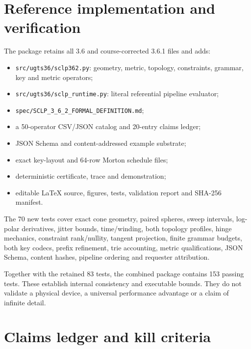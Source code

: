 \documentclass[10pt,a4paper]{article}
\newcommand{\code}[1]{\texttt{#1}}
\begin{document}
\section{Reference implementation and verification}

The package retains all 3.6 and course-corrected 3.6.1 files and adds:
\begin{itemize}
\item \code{src/ugts36/sclp362.py}: geometry, metric, topology, constraints, grammar, key and metric operators;
\item \code{src/ugts36/sclp\_runtime.py}: literal referential pipeline evaluator;
\item \code{spec/SCLP\_3\_6\_2\_FORMAL\_DEFINITION.md};
\item a 50-operator CSV/JSON catalog and 20-entry claims ledger;
\item JSON Schema and content-addressed example substrate;
\item exact key-layout and 64-row Morton schedule files;
\item deterministic certificate, trace and demonstration;
\item editable LaTeX source, figures, tests, validation report and SHA-256 manifest.
\end{itemize}

The 70 new tests cover exact cone geometry, paired spheres, sweep intervals, log-polar derivatives, jitter bounds, time/winding, both topology profiles, hinge mechanics, constraint rank/nullity, tangent projection, finite grammar budgets, both key codecs, prefix refinement, trie accounting, metric qualifications, JSON Schema, content hashes, pipeline ordering and requester attribution.

Together with the retained 83 tests, the combined package contains 153 passing tests. These establish internal consistency and executable bounds. They do not validate a physical device, a universal performance advantage or a claim of infinite detail.

\section{Claims ledger and kill criteria}


\end{document}
